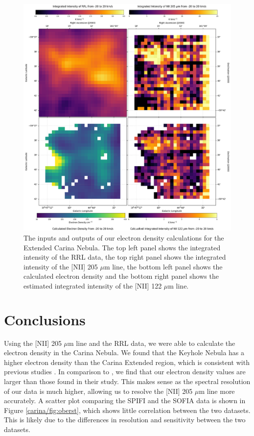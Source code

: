 \begin{figure}
    \centering
    \includegraphics[width=.9\textwidth]{figs/carina/carina/carina.png}
    \caption[Calculated Electron Density and {[}NII{]} 122 $\mu$m Maps for the Extended Carina Nebula]{
        The inputs and outputs of our electron density calculations for the Extended Carina Nebula.
        The top left panel shows the integrated intensity of the RRL data, the top right panel shows the integrated intensity of the [NII] 205 $\mu$m line, the bottom left panel shows the calculated electron density and the bottom right panel shows the estimated integrated intensity of the [NII] 122 $\mu$m line.
        }
    \label{carina/fig:result_carina}
\end{figure}

\section{Conclusions}
Using the [NII] 205 $\mu$m line and the RRL data, we were able to calculate the electron density in the Carina Nebula.
We found that the Keyhole Nebula has a higher electron density than the Carina Extended region, which is consistent with previous studies \parencite{brooks2000unlocking}.
In comparison to \cite{oberst2011205}, we find that our electron density values are larger than those found in their study.
This makes sense as the spectral resolution of our data is much higher, allowing us to resolve the [NII] 205 $\mu$m line more accurately.
A scatter plot comparing the SPIFI and the SOFIA data is shown in Figure \ref{carina/fig:oberst}, which shows little correlation between the two datasets.
This is likely due to the differences in resolution and sensitivity between the two datasets.

